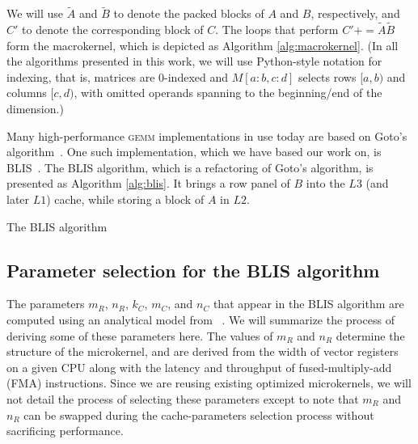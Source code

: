 \documentclass[12pt]{article}
\newcommand*{\TO}{\textbf{to}}
\newcommand*{\pluseq}{\mathrel{{+}{=}}}
\newcommand*{\gemm}{{\textsc{gemm}}}
\newcommand*{\mycite}[1]{~\cite{#1}}
\begin{document}
We will use $\widetilde{A}$ and $\widetilde{B}$ to denote the packed blocks of $A$ and $B$, respectively, and $C'$ to denote the corresponding block of $C$.
The loops that perform $C' \pluseq \widetilde{A}\widetilde{B}$ form the macrokernel, which is depicted as Algorithm \ref{alg:macrokernel}.
(In all the algorithms presented in this work, we will use Python-style notation for indexing, that is, matrices are 0-indexed and   $M[a:b, c:d]$ selects rows $[a, b)$ and columns $[c, d)$, with omitted operands spanning to the beginning/end of the dimension.)


Many high-performance \gemm{} implementations in use today are based on Goto's algorithm\mycite{Goto2008}.
One such implementation, which we have based our work on, is BLIS\mycite{VanZee2016}.
The BLIS algorithm, which is a refactoring of Goto's algorithm, is presented as Algorithm \ref{alg:blis}.
It brings a row panel of $B$ into the $L3$ (and later $L1$) cache, while storing a block of $A$ in $L2$.
\begin{algorithm}
  \caption{The BLIS algorithm}
  \label{alg:blis}
  \begin{tikzpicture}
    
  \end{tikzpicture}
  \begin{algorithmic}
    \For{$j \gets 0, n_C, \ldots$ \TO{} $n$}
    \For{$p \gets 0, k_C, \ldots$ \TO{} $k$}
    \For{$i \gets 0, m_C, \ldots$ \TO{} $m$}
    \EndFor{}
    \EndFor{}
    \EndFor{}
    \EndProcedure{}
  \end{algorithmic}
\end{algorithm}

\subsection{Parameter selection for the BLIS algorithm}\label{subsec:params}
The parameters $m_R$, $n_R$, $k_C$, $m_C$, and $n_C$ that appear in the BLIS algorithm are computed using an analytical model from \mycite{Low2016}.
We will summarize the process of deriving some of these parameters here.
The values of $m_R$ and $n_R$ determine the structure of the microkernel, and are derived from the width of vector registers on a given CPU along with the latency and throughput of fused-multiply-add (FMA) instructions.
Since we are reusing existing optimized microkernels, we will not detail the process of selecting these parameters except to note that $m_R$ and $n_R$ can be swapped during the cache-parameters selection process without sacrificing performance.
\end{document}
